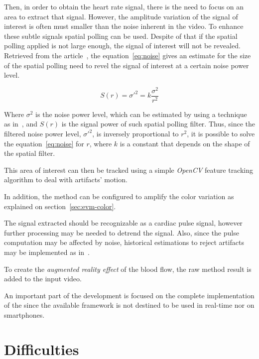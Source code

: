 Then, in order to obtain the heart rate signal, 
there is the need to focus on an area to extract that signal. However,
the amplitude variation of the signal of interest is often must smaller 
than the noise inherent in the video. To enhance these subtle signals 
spatial polling can be used. Despite of that if the spatial polling 
applied is not large enough, the signal of interest will not be revealed.
Retrieved from the article~\cite{Wu2012Eulerian}, the equation~\ref{eq:noise}
gives an estimate for the size of the spatial polling need to revel the 
signal of interest at a certain noise power level.

\begin{equation} \label{eq:noise}
  S(r) = \sigma'^2 = k \frac{\sigma^2}{r^2}
\end{equation}

Where $\sigma^2$ is the noise power level, which can be estimated by using 
a technique as in~\cite{Liu2006Noise}, and $S(r)$ is the signal power of
such spatial polling filter. Thus, since the filtered noise power level,
$\sigma'^2$, is inversely proportional to $r^2$, it is possible to solve the 
equation~\ref{eq:noise} for $r$, where $k$ is a constant that depends on the shape of the spatial filter.

This area of interest can then be tracked using a simple \emph{OpenCV} 
feature tracking algorithm to deal with artifacts' motion.

In addition, the \evm{} method can be configured to amplify the color
variation as explained on section~\ref{sec:evm-color}.

The signal extracted should be recognizable as a cardiac pulse signal,
however further processing may be needed to detrend the signal. Also, 
since the pulse computation may be affected by noise, historical estimations
to reject artifacts may be implemented as in~\cite{Poh2010Non}.

To create the \emph{augmented reality effect} of the blood flow, 
the raw \evm{} method result is added to the input video.

An important part of the development is focused on the complete 
implementation of the \evm{} since the available framework is not 
destined to be used in real-time nor on smartphones.

\section{Difficulties} \label{sec:difficulties}

